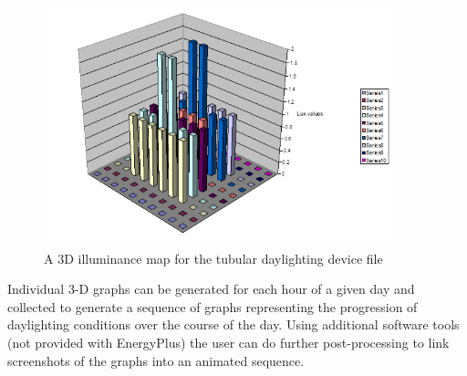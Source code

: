\begin{figure}[hbtp] %
\centering
\includegraphics[width=0.9\textwidth, height=0.9\textheight, keepaspectratio=true]{media/image021.png}
\caption{A 3D illuminance map for the tubular daylighting device file \protect \label{fig:a-3d-illuminance-map-for-the-tubular}}
\end{figure}

Individual 3-D graphs can be generated for each hour of a given day and collected to generate a sequence of graphs representing the progression of daylighting conditions over the course of the day. Using additional software tools (not provided with EnergyPlus) the user can do further post-processing to link screenshots of the graphs into an animated sequence.
